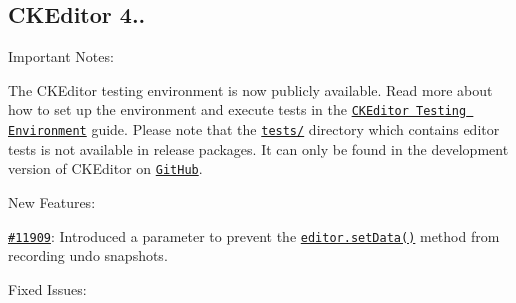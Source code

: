 \subsection*{C\+K\+Editor 4..}

Important Notes\+:


\begin{DoxyItemize}
\item The C\+K\+Editor testing environment is now publicly available. Read more about how to set up the environment and execute tests in the \href{http://docs.ckeditor.com/#!/guide/dev_tests}{\tt C\+K\+Editor Testing Environment} guide. Please note that the \href{https://github.com/ckeditor/ckeditor-dev/tree/master/tests}{\tt {\ttfamily tests/}} directory which contains editor tests is not available in release packages. It can only be found in the development version of C\+K\+Editor on \href{https://github.com/ckeditor/ckeditor-dev/}{\tt Git\+Hub}.
\end{DoxyItemize}

New Features\+:


\begin{DoxyItemize}
\item \href{http://dev.ckeditor.com/ticket/11909}{\tt \#11909}\+: Introduced a parameter to prevent the \href{http://docs.ckeditor.com/#!/api/CKEDITOR.editor-method-setData}{\tt {\ttfamily editor.\+set\+Data()}} method from recording undo snapshots.
\end{DoxyItemize}

Fixed Issues\+:


